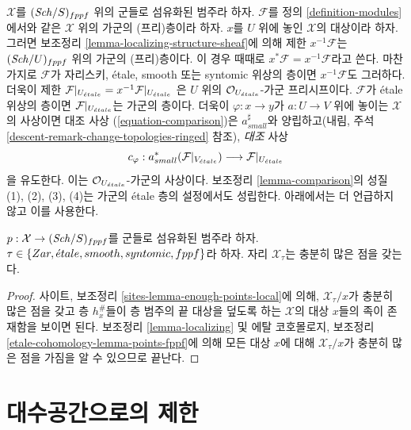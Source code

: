 \noindent
$\mathcal{X}$를 $(\mathit{Sch}/S)_{fppf}$ 위의 군들로 섬유화된 범주라 하자.
$\mathcal{F}$를 정의 \ref{definition-modules}에서와 같은
$\mathcal{X}$ 위의 가군의 (프리)층이라 하자.
$x$를 $U$ 위에 놓인 $\mathcal{X}$의 대상이라 하자. 그러면
보조정리 \ref{lemma-localizing-structure-sheaf}에 의해 제한
$x^{-1}\mathcal{F}$는 $(\mathit{Sch}/U)_{fppf}$ 위의 가군의 (프리)층이다.
이 경우 때때로 $x^*\mathcal{F} = x^{-1}\mathcal{F}$라고 쓴다.
마찬가지로 $\mathcal{F}$가 자리스키, \'etale, smooth 또는 syntomic
위상의 층이면 $x^{-1}\mathcal{F}$도 그러하다. 더욱이 제한
$\mathcal{F}|_{U_{\acute{e}tale}} = x^{-1}\mathcal{F}|_{U_{\acute{e}tale}}$
은 $U$ 위의 $\mathcal{O}_{U_{\acute{e}tale}}$-가군 프리시프이다.
$\mathcal{F}$가 \'etale 위상의 층이면
$\mathcal{F}|_{U_{\acute{e}tale}}$는 가군의 층이다. 더욱이
$\varphi : x \to y$가 $a : U \to V$ 위에 놓이는 $\mathcal{X}$의
사상이면 대조 사상 (\ref{equation-comparison})은
$a_{small}^\sharp$와 양립하고(내림, 주석
\ref{descent-remark-change-topologies-ringed} 참조),
{\it 대조} 사상
\begin{equation}
\label{equation-comparison-modules}
c_\varphi : a_{small}^*(\mathcal{F}|_{V_{\acute{e}tale}})
\longrightarrow
\mathcal{F}|_{U_{\acute{e}tale}}
\end{equation}
을 유도한다. 이는 $\mathcal{O}_{U_{\acute{e}tale}}$-가군의 사상이다.
보조정리 \ref{lemma-comparison}의 성질 (1), (2), (3), (4)는
가군의 \'etale 층의 설정에서도 성립한다. 아래에서는 더 언급하지
않고 이를 사용한다.

\begin{lemma}
\label{lemma-enough-points}
$p : \mathcal{X} \to (\mathit{Sch}/S)_{fppf}$를 군들로 섬유화된 범주라 하자.
$\tau \in \{Zar, {\acute{e}tale}, smooth, syntomic, fppf\}$라 하자.
자리 $\mathcal{X}_\tau$는 충분히 많은 점을 갖는다.
\end{lemma}

\begin{proof}
사이트, 보조정리 \ref{sites-lemma-enough-points-local}에 의해,
$\mathcal{X}_\tau/x$가 충분히 많은 점을 갖고 층 $h_x^\#$들이
층 범주의 끝 대상을 덮도록 하는 $\mathcal{X}$의 대상 $x$들의
족이 존재함을 보이면 된다. 보조정리 \ref{lemma-localizing} 및
에탈 코호몰로지, 보조정리
\ref{etale-cohomology-lemma-points-fppf}에 의해 모든 대상 $x$에 대해
$\mathcal{X}_\tau/x$가 충분히 많은 점을 가짐을 알 수 있으므로 끝난다.
\end{proof}







\section{대수공간으로의 제한}
\label{section-restriction-algebraic-spaces}

